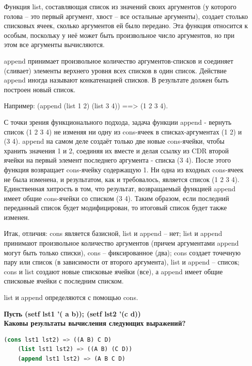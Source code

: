 \documentclass[12pt]{report}
\begin{document}
Функция list, составляющая список из значений своих аргументов (у которого голова -- это первый аргумент, хвост -- все остальные аргументы), создает столько списковых ячеек, сколько аргументов ей было передано. Эта функция относится к особым, поскольку у неё может быть произвольное число аргументов, но при этом все аргументы вычисляются.

append принимает произвольное количество аргументов-списков и соединяет (сливает)  элементы верхнего уровня всех списков в один список. Действие append иногда называют конкатенацией списков. В результате должен быть построен новый список.

Например: (append (list 1 2) (list 3 4)) ==> (1 2 3 4). 

С точки зрения функционального подхода, задача функции append - вернуть список (1 2 3 4) не изменяя ни одну из cons-ячеек в списках-аргументах (1 2) и (3 4). append на самом деле создаёт только две новые cons-ячейки, чтобы хранить значения 1 и 2, соединяя их вместе и делая ссылку из CDR второй ячейки на первый элемент последнего аргумента - списка (3 4). После этого функция возвращает cons-ячейку содержащую 1. Ни одна из входных cons-ячеек не была изменена, и результатом, как и требовалось, является список (1 2 3 4). Единственная хитрость в том, что результат, возвращаемый функцией append имеет общие cons-ячейки со списком (3 4). Таким образом, если последний переданный список будет модифицирован, то  итоговый список будет также изменен.


Итак, отличия: cons является базисной, list и append -- нет; list и append принимают произвольное количество аргументов (причем аргументами append могут быть только списки), cons -- фиксированное (два); cons создает точечную пару или список (в зависимости от второго аргумента), list и append -- список; cons и list создают новые списковые ячейки (все), а append имеет общие списковые ячейки с последним списком.

list и append определяются с помощью cons.

\textbf{Пусть (setf lst1 '( a b)); (setf lst2 '(c d))\\
	Каковы результаты вычисления следующих выражений?}


\begin{lstlisting}[language=Lisp]	
	(cons lst1 lst2) => ((A B) C D)
	(list lst1 lst2) => ((A B) (C D))
	(append lst1 lst2) => (A B C D)
\end{lstlisting}
\end{document}
